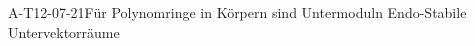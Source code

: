 
\begin{EXA}{A-T12-07-21}{Für Polynomringe in Körpern sind Untermoduln Endo-Stabile Untervektorräume}
\end{EXA}
